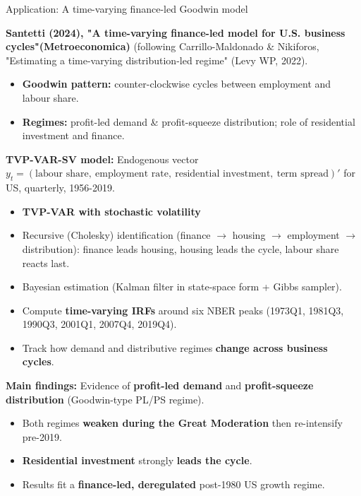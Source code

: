 \documentclass{beamer}
\begin{document}
\begin{frame}{Application: A time-varying finance-led Goodwin model}
\scriptsize

\textbf{Santetti (2024), "A time-varying finance-led model for U.S. business cycles"(Metroeconomica)} (following Carrillo-Maldonado \& Nikiforos, "Estimating a time-varying distribution-led regime" (Levy WP, 2022).

\begin{itemize}
\scriptsize
  \item \textbf{Goodwin pattern:} counter-clockwise cycles between employment and labour share.
  \item \textbf{Regimes:} profit-led demand \& profit-squeeze distribution; role of residential investment and finance.
\end{itemize}

\medskip
\textbf{TVP-VAR-SV model:} Endogenous vector $y_t = (\text{labour share},\ \text{employment rate},\ \text{residential investment},\ \text{term spread})'$ for US, quarterly, 1956-2019.
\begin{itemize}
  \item \textbf{TVP-VAR with stochastic volatility}
  \item Recursive (Cholesky) identification (finance $\rightarrow$ housing $\rightarrow$ employment $\rightarrow$ distribution): finance leads housing, housing leads the cycle, labour share reacts last.
  \item Bayesian estimation (Kalman filter in state-space form + Gibbs sampler).
\end{itemize}

\begin{itemize}
  \item Compute \textbf{time-varying IRFs} around six NBER peaks
        (1973Q1, 1981Q3, 1990Q3, 2001Q1, 2007Q4, 2019Q4).
  \item Track how demand and distributive regimes \textbf{change across business cycles}.
\end{itemize}

\medskip
\textbf{Main findings:} Evidence of \textbf{profit-led demand} and \textbf{profit-squeeze distribution} (Goodwin-type PL/PS regime).
\begin{itemize}
  \item Both regimes \textbf{weaken during the Great Moderation} then re-intensify pre-2019.
  \item \textbf{Residential investment} strongly \textbf{leads the cycle}.
  \item Results fit a \textbf{finance-led, deregulated} post-1980 US growth regime.
\end{itemize}

\end{frame}
\end{document}
